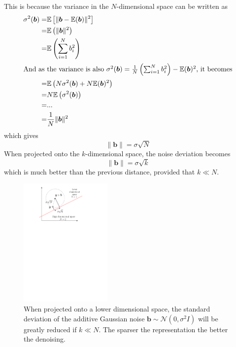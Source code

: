 This is because the variance in the $N$-dimensional space can be written as
\begin{align*}
\sigma^2(\bm{b}) =& \mathbb{E}\left[\lVert \bm{b}-\mathbb{E}(\bm{b}) \rVert^2 \right]\\
=& \mathbb{E}\left(\lVert \bm{b} \rVert^2 \right)\\
=& \mathbb{E}\left(\sum^N_{i=1} b_i^2 \right)\\
\shortintertext{And as the variance is also $\sigma^2(\bm{b})= \frac{1}{N}\left(\sum_{i=1}^N b_i^2 \right) - \mathbb{E}(\bm{b})^2$, it becomes}
=& \mathbb{E} \left(N\sigma^2(\bm{b}) + N\mathbb{E}(\bm{b})^2\right)\\
=& N \mathbb{E} \left(\sigma^2(\bm{b})\right)\\
=& ... \\
=& \frac{1}{N}\lVert \bm{b} \rVert^2
\end{align*}
which gives 
\begin{equation*} \lVert \bm{b} \rVert = \sigma\sqrt{N} \end{equation*}
When projected onto the $k$-dimensional space, the noise deviation becomes
\begin{equation*}\lVert \bm{b} \rVert = \sigma\sqrt{k} \end{equation*}
which is much better than the previous distance, provided that $k \ll N$. 

\begin{figure}[!ht]\centering
\includegraphics[width=0.4\textwidth]{figures/sparse-reduce-noise.pdf}
\caption{When projected onto a lower dimensional space, the standard deviation of the additive Gaussian noise $\bm{b} \sim \mathcal{N}(0,\sigma^2I)$ will be greatly reduced if $k \ll N$. The sparser the representation the better the denoising.\label{sparse_reduce_noise}}
\end{figure}

